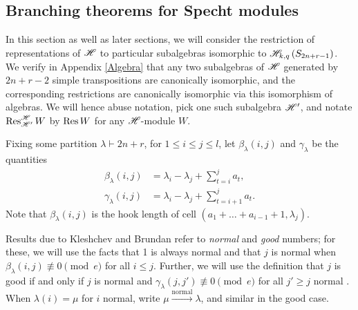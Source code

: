 \documentclass{amsart}
\begin{document}
  \subsection{Branching theorems for Specht modules}
  In this section as well as later sections, we will consider the restriction of representations of $\mathscr{H}$ to particular subalgebras isomorphic to $\mathscr{H}_{k,q}\left( S_{2n + r - 1} \right)$.
  We verify in Appendix \ref{Algebra} that any two subalgebras of $\mathscr{H}$ generated by $2n + r - 2$ simple transpositions are canonically isomorphic, and the corresponding restrictions are canonically isomorphic via this isomorphism of algebras.
  We will hence abuse notation, pick one such subalgebra $\mathscr{H}'$, and notate $\operatorname{Res}_{\mathscr{H}'}^{\mathscr{H}} W$ by $\operatorname{Res} W$ for any $\mathscr{H}$-module $W$.
  
  Fixing some partition $\lambda \vdash 2n + r$, for $1 \leq i \leq j \leq l$, let $\beta_\lambda(i,j)$ and $\gamma_\lambda$ be the quantities
  \begin{align*}
    \beta_\lambda(i,j) &= \lambda_i - \lambda_j + \sum_{t = i}^j a_t,\\
    \gamma_\lambda(i,j) &= \lambda_i - \lambda_j + \sum_{t = i+1}^j a_t.
  \end{align*}
  Note that $\beta_\lambda(i,j)$ is the hook length of cell $(a_1 + \dots + a_{i-1}+1,\lambda_j)$.

  Results due to Kleshchev and Brundan refer to \emph{normal} and \emph{good} numbers;
  for these, we will use the facts that 1 is always normal and that $j$ is normal when $\beta_\lambda(i,j) \not\equiv 0 \pmod e$ for all $i \leq j$.
  Further, we will use the definition that $j$ is good if and only if $j$ is normal and $\gamma_\lambda(j,j') \not\equiv 0 \pmod e$ for all $j' \geq j$ normal \cite{Brundan,Kleshchev}.
  When $\lambda(i) = \mu$ for $i$ normal, write $\mu \xrightarrow{\text{normal}} \lambda$, and similar in the good case.
\end{document}
